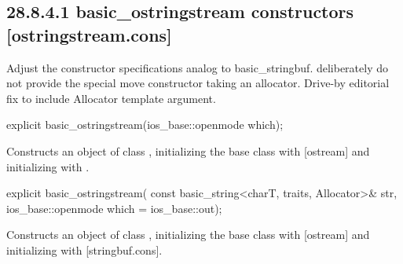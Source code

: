 \documentclass[ebook,11pt,article]{memoir}
\renewcommand{\iref}[1]{[#1]}
\begin{document}
\subsection{28.8.4.1 basic\_ostringstream constructors [ostringstream.cons]}

\begin{em}
Adjust the constructor specifications analog to basic_stringbuf. deliberately do not provide the special move constructor taking an allocator. Drive-by editorial fix to include Allocator template argument.
\end{em}

\begin{itemdecl}
explicit basic_ostringstream(ios_base::openmode which);
\end{itemdecl}

\begin{itemdescr}
\pnum
\effects
Constructs an object of class
,
initializing the base class with
\iref{ostream}
and initializing  with %
\linebreak
\iref{stringbuf.cons}.
\end{itemdescr}

%
\begin{itemdecl}
explicit basic_ostringstream(
  const basic_string<charT, traits, Allocator>& str,
  ios_base::openmode which = ios_base::out);
\end{itemdecl}

\begin{itemdescr}
\pnum
\effects
Constructs an object of class
,
initializing the base class with
\iref{ostream}
and initializing  with%
\iref{stringbuf.cons}.
\end{itemdescr}
\end{document}
